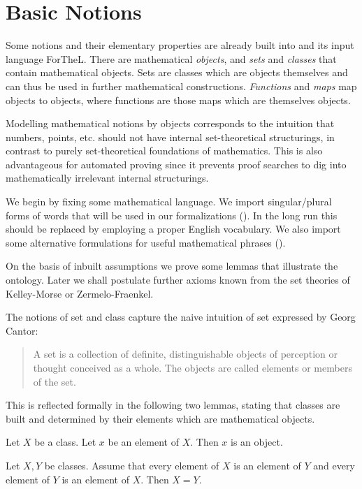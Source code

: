 \documentclass{article}
\begin{document}
\section{Basic Notions}

Some notions and their elementary properties are already
built into \Naproche{} and its input language
ForTheL. There are
mathematical {\em objects}, and {\em sets} and
{\em classes} that contain mathematical
objects. Sets are classes which are objects themselves and
can thus be used in further mathematical constructions.
{\em Functions}
and {\em maps} map objects to objects, where
functions are those
maps which are themselves objects.

Modelling mathematical notions by objects corresponds
to the intuition that numbers, points, etc. should
not have internal set-theoretical
structurings, in contrast to purely set-theoretical
foundations of mathematics. This is also advantageous
for automated proving since it prevents proof searches to
dig into mathematically irrelevant internal structurings.

We begin by fixing some mathematical language.
We import singular/plural forms of words that will be used in
our formalizations ().
In the long run this should be replaced by
employing a proper English vocabulary. We also
import some alternative formulations for
useful mathematical phrases ().

On the basis of inbuilt assumptions we prove some
lemmas that illustrate the \Naproche{} ontology.
Later we shall postulate further axioms known from the
set theories of Kelley-Morse or Zermelo-Fraenkel.

The notions of set and class capture the naive intuition
of set expressed by Georg Cantor:
%
\begin{quotation}
\noindent A set is a collection of definite, distinguishable objects
of perception or thought conceived as a whole.
The objects are called elements or members of the set.
\end{quotation}
%
This is reflected formally in the following two lemmas, stating
that classes are built and determined by their
elements which are mathematical objects.

\begin{forthel}

\begin{proposition}
Let $X$ be a class. Let $x$ be an element of $X$.
Then $x$ is an object.
\end{proposition}

\begin{lemma}
    Let $X, Y$ be classes.
    Assume that every element of $X$ is an element of $Y$ and every element of
    $Y$ is an element of $X$.
    Then $X = Y$.
\end{lemma}

\end{forthel}
\end{document}
